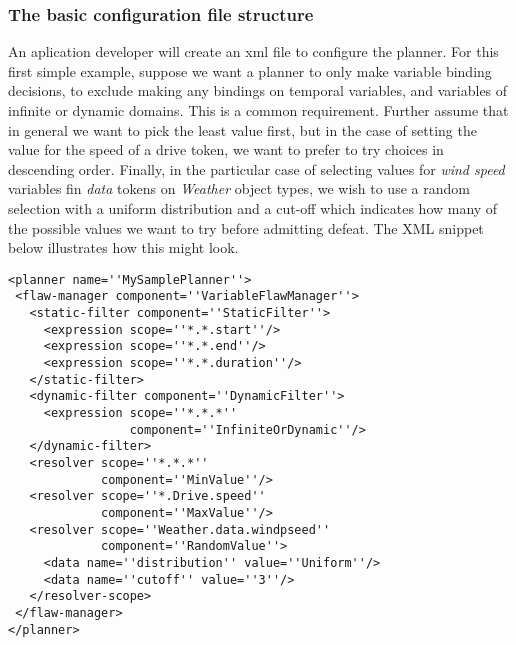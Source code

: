 \documentclass[10pt, letterpaper, oneside]{article}
\begin{document}
\subsubsection{The basic configuration file structure}
An aplication developer will create an xml file to configure the planner. For this first simple example, suppose we want a planner to only make variable binding decisions, to exclude making any bindings on temporal variables, and variables of infinite or dynamic domains. This is a common requirement. Further assume that in general we want to pick the least value first, but in the case of setting the value for the speed of a drive token, we want to prefer to try choices in descending order. Finally, in the particular case of selecting values for {\em wind speed} variables fin {\em data} tokens on {\em Weather} object types, we wish to use a random selection with a uniform distribution and a cut-off which indicates how many of the possible values we want to try before admitting defeat. The XML snippet below illustrates how this might look.
\begin{verbatim}
<planner name=''MySamplePlanner''>
 <flaw-manager component=''VariableFlawManager''>
   <static-filter component=''StaticFilter''>
     <expression scope=''*.*.start''/>
     <expression scope=''*.*.end''/>
     <expression scope=''*.*.duration''/>
   </static-filter>
   <dynamic-filter component=''DynamicFilter''>
     <expression scope=''*.*.*'' 
                 component=''InfiniteOrDynamic''/>
   </dynamic-filter>
   <resolver scope=''*.*.*'' 
             component=''MinValue''/>
   <resolver scope=''*.Drive.speed''
             component=''MaxValue''/>
   <resolver scope=''Weather.data.windpseed''
             component=''RandomValue''>
     <data name=''distribution'' value=''Uniform''/>
     <data name=''cutoff'' value=''3''/>
   </resolver-scope>
 </flaw-manager>
</planner>
\end{verbatim}
\end{document}
